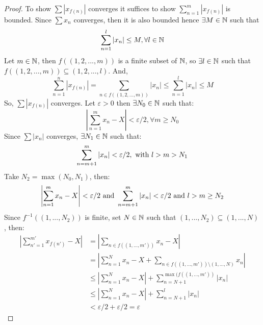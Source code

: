 \begin{proof}
    To show $\sum |x_{f(n)}|$ converges it suffices to show $\sum_{n=1}^m |x_{f(n)}|$ is bounded. Since $\sum x_n$ converges, then it is also bounded hence $\exists M \in \mathbb{N}$ such that
    \begin{equation*}
        \sum \limits_{n=1}^l |x_n| \leq M, \forall l \in \mathbb{N}
    \end{equation*}
    Let $m \in \mathbb{N}$, then $f((1, 2, ..., m))$ is a finite subset of $\mathbb{N}$, so $\exists l \in \mathbb{N}$ such that $f((1, 2, ..., m)) \subseteq (1, 2, ..., l)$. And,
    \begin{equation*}
        \sum \limits_{n=1}^n |x_{f(n)}| = \sum \limits_{n \in f((1, 2, ..., m))} |x_n| \leq \sum \limits_{n=1}^l |x_n| \leq M
    \end{equation*}
    So, $\sum |x_{f(n)}|$ converges. Let $\varepsilon  > 0$ then $\exists N_0 \in \mathbb{N}$ such that:
    \begin{equation*}
        \left |
            \sum \limits_{n=1}^m x_n - X
        \right | < \varepsilon/2, \forall m \geq N_0
    \end{equation*}
    Since $\sum |x_n|$ converges, $\exists N_1 \in \mathbb{N}$ such that:
    \begin{equation*}
        \sum \limits_{n=m+1}^m |x_n| < \varepsilon/2, \textnormal{ with } l > m > N_1
    \end{equation*}
    Take $N_2 = \max(N_0, N_1)$, then:
    \begin{equation*}
        \left |
            \sum \limits_{n=1}^m x_n - X
        \right | < \varepsilon/2
        \textnormal{ and }
        \sum \limits_{n=m+1}^m |x_n| < \varepsilon/2
        \textnormal{ and }
        l > m \geq N_2
    \end{equation*}
    Since $f^{-1}((1, ..., N_2))$ is finite, set $N \in \mathbb{N}$ such that $(1, ..., N_2) \subseteq (1, ..., N)$, then:
    \begin{align*}
        \left |
            \sum \limits_{n'=1}^{m'} x_{f(n')} - X
        \right | &= 
        \left |
            \sum \limits_{n \in f(( 1, ..., m'))} x_n - X
        \right | \\
        &= \left |
            \sum \limits_{n=1}^N x_n - X
            + \sum \limits_{n \in f((1, ..., m')) \setminus (1, ..., N)} x_n
        \right | \\
        &\leq
        \left |
            \sum \limits_{n=1}^N x_n - X
        \right | + \sum \limits_{n=N+1}^{\max (f((1, ..., m'))} |x_n|  \\
        &\leq 
        \left |
            \sum \limits_{n=1}^N x_n - X
        \right | + \sum \limits_{n=N+1}^{l} |x_n|  \\
        &< \varepsilon/2 + \varepsilon/2 = \varepsilon
    \end{align*} 
\end{proof}

